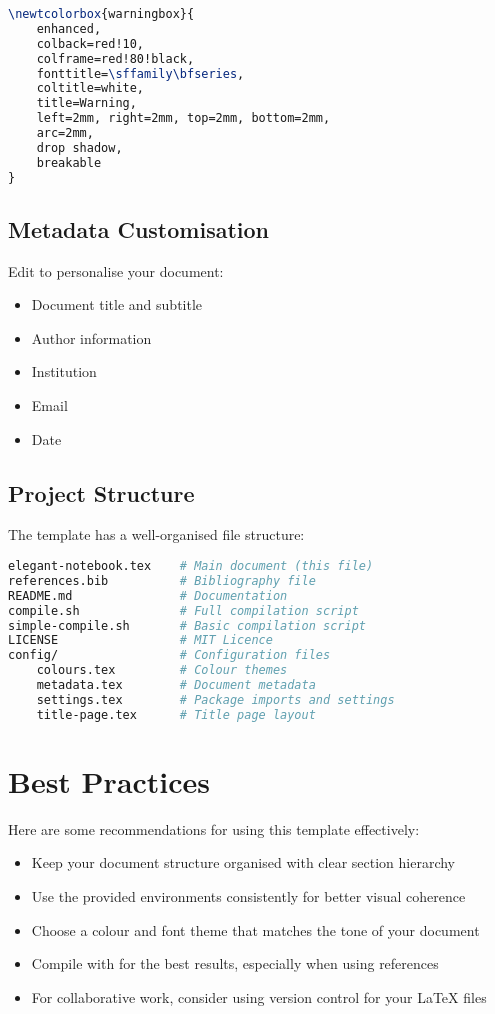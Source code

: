 \documentclass[a4paper,11pt]{article}
\begin{document}
\begin{lstlisting}[language=TeX, caption={Creating a custom box type}, label={lst:custombox}]
\newtcolorbox{warningbox}{
    enhanced,
    colback=red!10,
    colframe=red!80!black,
    fonttitle=\sffamily\bfseries,
    coltitle=white,
    title=Warning,
    left=2mm, right=2mm, top=2mm, bottom=2mm,
    arc=2mm,
    drop shadow,
    breakable
}
\end{lstlisting}

\subsection{Metadata Customisation}
Edit  to personalise your document:
\begin{itemize}
    \item Document title and subtitle
    \item Author information
    \item Institution
    \item Email
    \item Date
\end{itemize}

\subsection{Project Structure}
The template has a well-organised file structure:

\begin{lstlisting}[language=bash, caption={Project directory structure}, label={lst:structure}]
elegant-notebook.tex    # Main document (this file)
references.bib          # Bibliography file
README.md               # Documentation
compile.sh              # Full compilation script
simple-compile.sh       # Basic compilation script
LICENSE                 # MIT Licence
config/                 # Configuration files
    colours.tex         # Colour themes
    metadata.tex        # Document metadata
    settings.tex        # Package imports and settings
    title-page.tex      # Title page layout
\end{lstlisting}

\section{Best Practices}
Here are some recommendations for using this template effectively:

\begin{itemize}
    \item Keep your document structure organised with clear section hierarchy
    \item Use the provided environments consistently for better visual coherence
    \item Choose a colour and font theme that matches the tone of your document
    \item Compile with  for the best results, especially when using references
    \item For collaborative work, consider using version control for your LaTeX files
\end{itemize}
\end{document}
